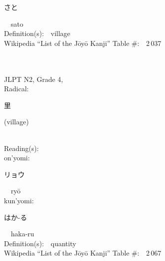 \begin{multicols}{2}
{\hspace*{2em}}{\begin{CJK}{UTF8}{min} さと \end{CJK}}\ \ sato\ \ \\
Definition(s):\ \ village \\
Wikipedia ``List of the J\=oy\=o Kanji'' Table \#:\ \ 2\,037 \\
\ \ \\
{\fontsize{34pt}{40pt}  }\ \ \\  %
{JLPT N2, Grade 4, \\Radical:\ \ {\begin{CJK}{UTF8}{min} 里 \end{CJK}} (village) } \\
Reading(s):\ \ \\
{\hspace*{1em}}on'yomi:\ \ \\
{\hspace*{2em}}{\begin{CJK}{UTF8}{min} リョウ \end{CJK}}\ \ ry\=o\ \ \\
{\hspace*{1em}}kun'yomi:\ \ \\
{\hspace*{2em}}{\begin{CJK}{UTF8}{min} はか-る \end{CJK}}\ \ haka-ru\ \ \\
Definition(s):\ \ quantity \\
Wikipedia ``List of the J\=oy\=o Kanji'' Table \#:\ \ 2\,067 \\
\ \ \\
\end{multicols}



